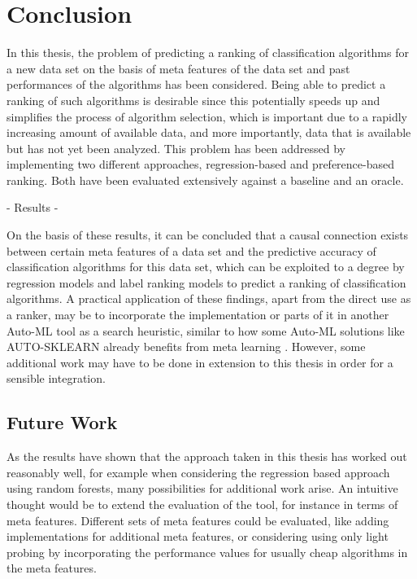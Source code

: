 \chapter{Conclusion}
\label{sec:conclusion}
In this thesis, the problem of predicting a ranking of classification algorithms for a new data set on the basis of meta features of the data set and past performances of the algorithms has been considered. Being able to predict a ranking of such algorithms is desirable since this potentially speeds up and simplifies the process of algorithm selection, which is important due to a rapidly increasing amount of available data, and more importantly, data that is available but has not yet been analyzed. This problem has been addressed by implementing two different approaches, regression-based and preference-based ranking. Both have been evaluated extensively against a baseline and an oracle.

- Results - 

On the basis of these results, it can be concluded that a causal connection exists between certain meta features of a data set and the predictive accuracy of classification algorithms for this data set, which can be exploited to a degree by regression models and label ranking models to predict a ranking of classification algorithms. A practical application of these findings, apart from the direct use as a ranker, may be to incorporate the implementation or parts of it in another Auto-ML tool as a search heuristic, similar to how some Auto-ML solutions like AUTO-SKLEARN already benefits from meta learning \cite{feurer2015efficient}. However, some additional work may have to be done in extension to this thesis in order for a sensible integration.

\section{Future Work}
\label{sec:conclusion:future}
As the results have shown that the approach taken in this thesis has worked out reasonably well, for example when considering the regression based approach using random forests, many possibilities for additional work arise. An intuitive thought would be to extend the evaluation of the tool, for instance in terms of meta features. Different sets of meta features could be evaluated, like adding implementations for additional meta features, or considering using only light probing by incorporating the performance values for usually cheap algorithms in the meta features. 


